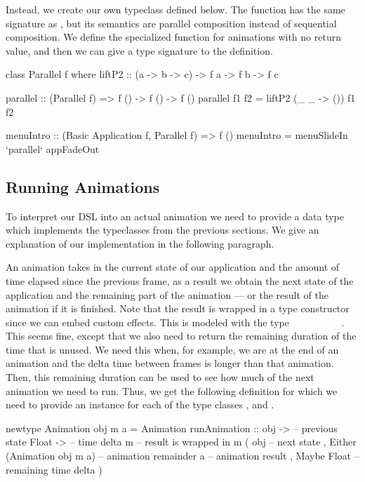 Instead, we create our own  typeclass defined below. The function  has the same signature as , but its semantics are parallel composition instead of sequential composition. We define the specialized  function for animations with no return value, and then we can give a type signature to the  definition.

\begin{code}
class Parallel f where
  liftP2 :: (a -> b -> c) -> f a -> f b -> f c

parallel :: (Parallel f) => f () -> f () -> f ()
parallel f1 f2 = liftP2 (\_ _ -> ()) f1 f2

menuIntro :: (Basic Application f, Parallel f) => f ()
menuIntro = menuSlideIn `parallel` appFadeOut
\end{code}

\subsection{Running Animations}

To interpret our DSL into an actual animation we need to provide a data type which implements the typeclasses from the previous sections. We give an explanation of our implementation in the following paragraph.

An animation takes in the current state of our application and the amount of time elapsed since the previous frame, as a result we obtain the next state of the application and the remaining part of the animation --- or the result of the animation if it is finished. Note that the result is wrapped in a type constructor  since we can embed custom effects. This is modeled with the type ~\hs{->}~~\hs{->}~~~~~~~. This seems fine, except that we also need to return the remaining duration of the time that is unused. We need this when, for example, we are at the end of an animation and the delta time between frames is longer than that animation. Then, this remaining duration can be used to see how much of the next animation we need to run. Thus, we get the following definition for which we need to provide an instance for each of the type classes ,  and .

\begin{code}
newtype Animation obj m a = Animation {
  runAnimation ::
    obj -> -- previous state
    Float -> -- time delta
    m -- result is wrapped in m
      ( obj -- next state
      , Either
          (Animation obj m a) -- animation remainder
          a -- animation result
      , Maybe Float -- remaining time delta
      )
}
\end{code}

